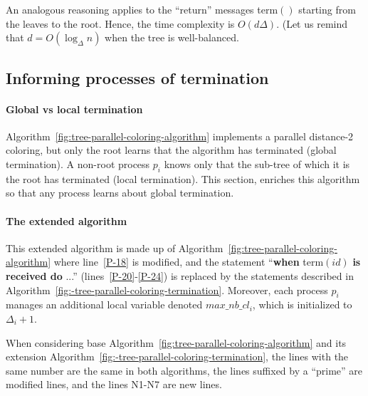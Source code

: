 \documentclass[11pt,english]{article}
\begin{document}
An analogous reasoning applies to the ``return'' messages {\sc term}$()$ 
starting from the leaves to the root. Hence, the time complexity is 
$O(d\Delta)$. (Let us remind that $d=O(\log_\Delta n)$
when the tree is well-balanced.

\subsection{Informing  processes of termination}
\label{sec:inform-others}

\paragraph{Global vs local termination}
Algorithm~\ref{fig:tree-parallel-coloring-algorithm} implements a
parallel distance-2 coloring, but only the root learns that the
algorithm has terminated (global termination). A non-root process
$p_i$ knows only that the sub-tree of which it is the root has terminated
(local termination).  This section, enriches this algorithm so that any
process learns about global termination. 


\paragraph{The extended algorithm}
This extended algorithm is made up of
Algorithm~\ref{fig:tree-parallel-coloring-algorithm} where 
line~\ref{P-18} is modified, and the
statement ``{\bf when} {\sc term}$(id)$ {\bf is received do} ...''
(lines~\ref{P-20}-\ref{P-24}) is replaced by the statements described in 
Algorithm~\ref{fig:-tree-parallel-coloring-termination}.  Moreover,
each process $p_i$ manages an additional local variable denoted
$max\_nb\_cl_i$, which is initialized to $\Delta_i+1$.


When considering base Algorithm~\ref{fig:tree-parallel-coloring-algorithm} 
and its extension Algorithm~\ref{fig:-tree-parallel-coloring-termination}, 
the lines with the same number are the same in both algorithms, 
the lines suffixed by a ``prime'' are modified lines, and the lines 
N1-N7 are new lines. 
\end{document}
